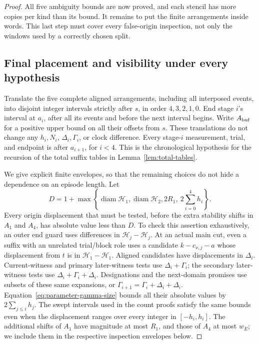 \begin{proof}
All five ambiguity bounds are now proved, and each stencil has more
copies per kind than its bound. It remains to put the finite arrangements
inside words. This last step must cover every false-origin inspection,
not only the windows used by a correctly chosen split.

\subsection*{Final placement and visibility under every hypothesis}
Translate the five complete aligned arrangements, including all
interposed events, into disjoint integer intervals strictly after
\(s\), in order \(4,3,2,1,0\).  End stage \(i\)'s interval at
\(a_i\), after all its events and before the next interval begins.
Write \(A_{\rm buf}\) for a positive upper bound on all their offsets
from \(s\).  These translations do not change any \(h_i,N_i\),
\(\Delta_i,\Gamma_i\), or clock difference.  Every stage-\(i\)
measurement, trial, and endpoint is after \(a_{i+1}\), for \(i<4\).
This is the chronological hypothesis for the recursion of the total
suffix tables in Lemma~\ref{lem:total-tables}.

We give explicit finite envelopes, so that the remaining choices do
not hide a dependence on an episode length.  Let
\begin{equation}\label{eq:parameter-origin-envelope}
 D=1+\max\left\{
 \operatorname{diam}\mathcal H_1,
 \operatorname{diam}\mathcal H_2,
 2R_1,\ 2\sum_{i=0}^4h_i\right\}.
\end{equation}
Every origin displacement that must be tested, before the extra
stability shifts in \(A_1\) and \(A_4\), has absolute value less
than \(D\).  To check this assertion exhaustively, an outer end guard
uses differences in \(\mathcal H_j-\mathcal H_j\).  At an actual
main cut, even a suffix with an unrelated trial/block role uses a
candidate \(k-c_{\nu,j}-a\) whose displacement from \(t\) is in
\(\mathcal H_1-\mathcal H_1\).  Aligned candidates have displacements
in \(\Delta_i\).  Current-witness and primary later-witness tests
use \(\Delta_i+\Gamma_i\); the secondary later-witness tests use
\(\Delta_i+\Gamma_i+\Delta_i\).  Designations and the next-domain
promises use subsets of these same expansions, or
\(\Gamma_{i+1}=\Gamma_i+\Delta_i+\Delta_i\).
Equation~\eqref{eq:parameter-gamma-size} bounds all their absolute
values by \(2\sum_{j\le i}h_j\).  The swept intervals used in the
count proofs satisfy the same bounds even when the displacement
ranges over every integer in \([-h_i,h_i]\).
The additional shifts of \(A_1\) have magnitude at most \(R_1\),
and those of \(A_4\) at most \(w_E\); we include them in the respective
inspection envelopes below.


\end{proof}
